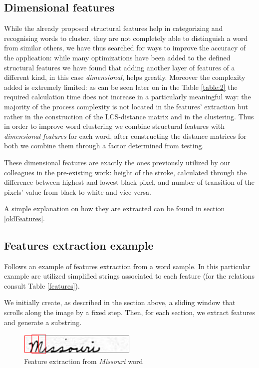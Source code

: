 \subsection{Dimensional features}
While the already proposed structural features help in categorizing and recognising words to cluster, they are not completely able to distinguish a word from similar others, we have thus searched for ways to improve the accuracy of the application:
while many optimizations have been added to the defined structural features we have found that adding another layer of features of a different kind, in this case \emph{dimensional}, helps greatly.
Moreover the complexity added is extremely limited: as can be seen later on in the Table \ref{table:2} the required calculation time does not increase in a particularly meaningful way: the majority of the process complexity is not located in the features' extraction but rather in the construction of the LCS-distance matrix and in the clustering.  
Thus in order to improve word clustering we combine structural features with \emph{dimensional features} for each word, after constructing the distance matrices for both we combine them through a factor determined from testing. 

These dimensional features are exactly the ones previously utilized by our colleagues in the pre-existing work: height of the stroke, calculated through the difference between highest and lowest black pixel, and number of transition of the pixels' value from black to white and vice versa.

A simple explanation on how they are extracted can be found in section \ref{oldFeatures}.

\subsection{Features extraction example}
\label{FEE}
Follows an example of features extraction from a word sample.
In this particular example are utilized simplified strings associated to each feature (for the relations consult Table \ref{features}).

We initially create, as described in the section above, a sliding window that scrolls along the image by a fixed step. Then, for each section, we extract features and generate a substring.

\begin{figure}[!htpb]
\centering
\includegraphics[width=0.5\textwidth]{images/missouri_crop.jpg}
\caption{Feature extraction from \emph{Missouri} word}
\end{figure} 

